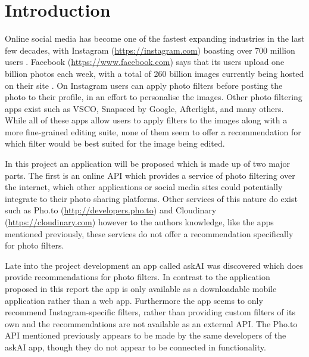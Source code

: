 \documentclass[a4paper,12pt]{report}
\begin{document}
\chapter{Introduction} 
  Online social media has become one of the fastest expanding industries in the last few decades, with Instagram (\url{https://instagram.com}) boasting over 700 million users \citep{instagram2017users}. Facebook (\url{https://www.facebook.com}) says that its users upload one billion photos each week, with a total of 260 billion images currently being hosted on their site \citep{beaver2010finding}. On Instagram users can apply photo filters before posting the photo to their profile, in an effort to personalise the images. Other photo filtering apps exist such as VSCO, Snapseed by Google, Afterlight, and many others. While all of these apps allow users to apply filters to the images along with a more fine-grained editing suite, none of them seem to offer a recommendation for which filter would be best suited for the image being edited.

  In this project an application will be proposed which is made up of two major parts. The first is an online API which provides a service of photo filtering over the internet, which other applications or social media sites could potentially integrate to their photo sharing platforms. Other services of this nature do exist such as Pho.to (\url{http://developers.pho.to}) and Cloudinary (\url{https://cloudinary.com}) however to the authors knowledge, like the apps mentioned previously, these services do not offer a recommendation specifically for photo filters.

  Late into the project development an app called askAI \citep{askai2017app} was discovered which does provide recommendations for photo filters. In contrast to the application proposed in this report the app is only available as a downloadable mobile application rather than a web app. Furthermore the app seems to only recommend Instagram-specific filters, rather than providing custom filters of its own and the recommendations are not available as an external API. The Pho.to API mentioned previously appears to be made by the same developers of the askAI app, though they do not appear to be connected in functionality.
\end{document}
